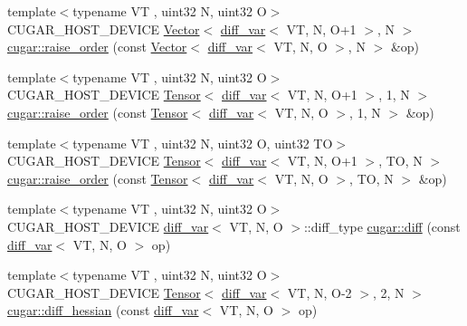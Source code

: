 \begin{DoxyCompactItemize}
\item 
{\footnotesize template$<$typename VT , uint32 N, uint32 O$>$ }\\C\+U\+G\+A\+R\+\_\+\+H\+O\+S\+T\+\_\+\+D\+E\+V\+I\+CE \hyperlink{structcugar_1_1_vector}{Vector}$<$ \hyperlink{structcugar_1_1diff__var}{diff\+\_\+var}$<$ VT, N, O+1 $>$, N $>$ \hyperlink{group___auto_diff_module_ga5ffca09f2068cbef476ec0b01471b048}{cugar\+::raise\+\_\+order} (const \hyperlink{structcugar_1_1_vector}{Vector}$<$ \hyperlink{structcugar_1_1diff__var}{diff\+\_\+var}$<$ VT, N, O $>$, N $>$ \&op)
\item 
{\footnotesize template$<$typename VT , uint32 N, uint32 O$>$ }\\C\+U\+G\+A\+R\+\_\+\+H\+O\+S\+T\+\_\+\+D\+E\+V\+I\+CE \hyperlink{structcugar_1_1_tensor}{Tensor}$<$ \hyperlink{structcugar_1_1diff__var}{diff\+\_\+var}$<$ VT, N, O+1 $>$, 1, N $>$ \hyperlink{group___auto_diff_module_ga927a53d59463095a4233941b69143e3d}{cugar\+::raise\+\_\+order} (const \hyperlink{structcugar_1_1_tensor}{Tensor}$<$ \hyperlink{structcugar_1_1diff__var}{diff\+\_\+var}$<$ VT, N, O $>$, 1, N $>$ \&op)
\item 
{\footnotesize template$<$typename VT , uint32 N, uint32 O, uint32 TO$>$ }\\C\+U\+G\+A\+R\+\_\+\+H\+O\+S\+T\+\_\+\+D\+E\+V\+I\+CE \hyperlink{structcugar_1_1_tensor}{Tensor}$<$ \hyperlink{structcugar_1_1diff__var}{diff\+\_\+var}$<$ VT, N, O+1 $>$, TO, N $>$ \hyperlink{group___auto_diff_module_ga82f8f2fd2da48a18577ce68213e366a3}{cugar\+::raise\+\_\+order} (const \hyperlink{structcugar_1_1_tensor}{Tensor}$<$ \hyperlink{structcugar_1_1diff__var}{diff\+\_\+var}$<$ VT, N, O $>$, TO, N $>$ \&op)
\item 
{\footnotesize template$<$typename VT , uint32 N, uint32 O$>$ }\\C\+U\+G\+A\+R\+\_\+\+H\+O\+S\+T\+\_\+\+D\+E\+V\+I\+CE \hyperlink{structcugar_1_1diff__var}{diff\+\_\+var}$<$ VT, N, O $>$\+::diff\+\_\+type \hyperlink{group___auto_diff_module_ga4d07150db2aa5b201c75e376b5580eba}{cugar\+::diff} (const \hyperlink{structcugar_1_1diff__var}{diff\+\_\+var}$<$ VT, N, O $>$ op)
\item 
{\footnotesize template$<$typename VT , uint32 N, uint32 O$>$ }\\C\+U\+G\+A\+R\+\_\+\+H\+O\+S\+T\+\_\+\+D\+E\+V\+I\+CE \hyperlink{structcugar_1_1_tensor}{Tensor}$<$ \hyperlink{structcugar_1_1diff__var}{diff\+\_\+var}$<$ VT, N, O-\/2 $>$, 2, N $>$ \hyperlink{group___auto_diff_module_ga518dc6dc852ca96522bcbb651298a625}{cugar\+::diff\+\_\+hessian} (const \hyperlink{structcugar_1_1diff__var}{diff\+\_\+var}$<$ VT, N, O $>$ op)

\end{DoxyCompactItemize}
